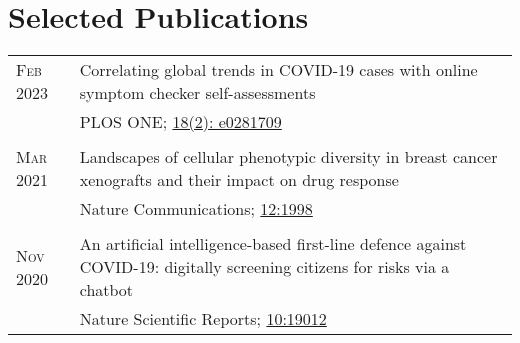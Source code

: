 \section{Selected Publications}
\begin{tabular}{>{\raggedleft}p{2.15cm}|p{12cm}}

 \textsc{Feb 2023} & Correlating global trends in COVID-19 cases with online symptom checker self-assessments \\
 & PLOS ONE; \href{https://doi.org/10.1371/journal.pone.0281709}{18(2): e0281709}  \\
 
\multicolumn{2}{c}{}\\
 \textsc{Mar 2021} & Landscapes of cellular phenotypic diversity in breast cancer xenografts and their impact on drug response \\
& Nature Communications; \href{https://doi.org/10.1038/s41467-021-22303-z}{12:1998}  \\ 
 
 \multicolumn{2}{c}{}\\
 \textsc{Nov 2020} & An artificial intelligence-based first-line defence against COVID-19: digitally screening citizens for risks via a chatbot  \\
& Nature Scientific Reports; \href{https://www.nature.com/articles/s41598-020-75912-x}{10:19012}  \\



%


\end{tabular}
